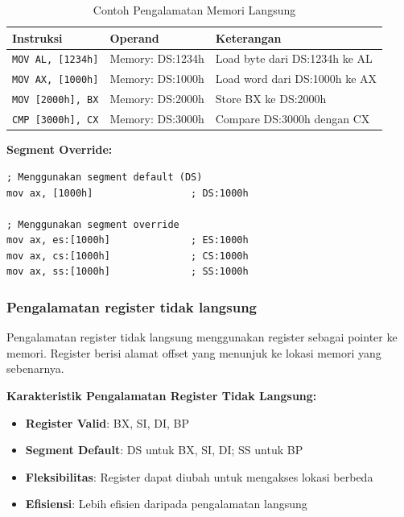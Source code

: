 \begin{table}[h]
\centering
\caption{Contoh Pengalamatan Memori Langsung}
\begin{tabular}{|p{4cm}|p{4cm}|p{7cm}|}
\hline
\textbf{Instruksi} & \textbf{Operand} & \textbf{Keterangan} \\
\hline
\texttt{MOV AL, [1234h]} & Memory: DS:1234h & Load byte dari DS:1234h ke AL \\
\hline
\texttt{MOV AX, [1000h]} & Memory: DS:1000h & Load word dari DS:1000h ke AX \\
\hline
\texttt{MOV [2000h], BX} & Memory: DS:2000h & Store BX ke DS:2000h \\
\hline
\texttt{CMP [3000h], CX} & Memory: DS:3000h & Compare DS:3000h dengan CX \\
\hline
\end{tabular}
\label{tab:direct-memory-addressing-examples}
\end{table}

\textbf{Segment Override:}
\begin{lstlisting}[language={[x86masm]Assembler}, caption=Segment Override dalam Pengalamatan Memori, label=lst:segment-override]
; Menggunakan segment default (DS)
mov ax, [1000h]                 ; DS:1000h

; Menggunakan segment override
mov ax, es:[1000h]              ; ES:1000h
mov ax, cs:[1000h]              ; CS:1000h
mov ax, ss:[1000h]              ; SS:1000h
\end{lstlisting}

\subsubsection{Pengalamatan register tidak langsung}
Pengalamatan register tidak langsung menggunakan register sebagai pointer ke memori. Register berisi alamat offset yang menunjuk ke lokasi memori yang sebenarnya.

\textbf{Karakteristik Pengalamatan Register Tidak Langsung:}
\begin{itemize}
    \item \textbf{Register Valid}: BX, SI, DI, BP
    \item \textbf{Segment Default}: DS untuk BX, SI, DI; SS untuk BP
    \item \textbf{Fleksibilitas}: Register dapat diubah untuk mengakses lokasi berbeda
    \item \textbf{Efisiensi}: Lebih efisien daripada pengalamatan langsung
\end{itemize}

